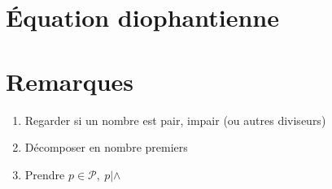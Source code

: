 \documentclass[fleqn]{article}
\theoremstyle{definition} \newtheorem*{defi}{D\'efinition}
\theoremstyle{definition} \newtheorem*{theo}{Th\'eor\`eme}
\theoremstyle{definition} \newtheorem*{coro}{Corollaire}
\theoremstyle{remark} \newtheorem*{rqs}{Remarques}
\theoremstyle{definition} \newtheorem*{prop}{Propri\'et\'e}
\begin{document}
\section{\'Equation diophantienne}

\section{Remarques}
\begin{enumerate}
	\item Regarder si un nombre est pair, impair (ou autres diviseurs)
	\item D\'ecomposer en nombre premiers
	\item Prendre $p \in \mathcal{P},\ p | \land$
\end{enumerate}
\end{document}
